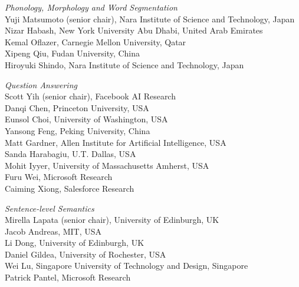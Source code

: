 \emph{Phonology, Morphology and Word Segmentation} \\
\hspace*{0.2in}Yuji Matsumoto (senior chair), Nara Institute of Science and Technology, Japan \\ 
\hspace*{0.2in}Nizar Habash, New York University Abu Dhabi, United Arab Emirates \\
\hspace*{0.2in}Kemal Oflazer, Carnegie Mellon University, Qatar \\
\hspace*{0.2in}Xipeng Qiu, Fudan University, China \\
\hspace*{0.2in}Hiroyuki Shindo, Nara Institute of Science and Technology, Japan 


\emph{Question Answering} \\
\hspace*{0.2in}Scott Yih (senior chair), Facebook AI Research \\ 
\hspace*{0.2in}Danqi Chen, Princeton University, USA \\
\hspace*{0.2in}Eunsol Choi, University of Washington, USA \\
\hspace*{0.2in}Yansong Feng, Peking University, China \\
\hspace*{0.2in}Matt Gardner, Allen Institute for Artificial Intelligence, USA \\
\hspace*{0.2in}Sanda Harabagiu, U.T. Dallas, USA \\
\hspace*{0.2in}Mohit Iyyer, University of Massachusetts Amherst, USA \\
\hspace*{0.2in}Furu Wei, Microsoft Research \\
\hspace*{0.2in}Caiming Xiong, Salesforce Research


\emph{Sentence-level Semantics} \\
\hspace*{0.2in}Mirella Lapata (senior chair), University of Edinburgh, UK \\
\hspace*{0.2in}Jacob Andreas, MIT, USA \\
\hspace*{0.2in}Li Dong, University of Edinburgh, UK \\
\hspace*{0.2in}Daniel Gildea, University of Rochester, USA \\
\hspace*{0.2in}Wei Lu, Singapore University of Technology and Design, Singapore \\
\hspace*{0.2in}Patrick Pantel, Microsoft Research


